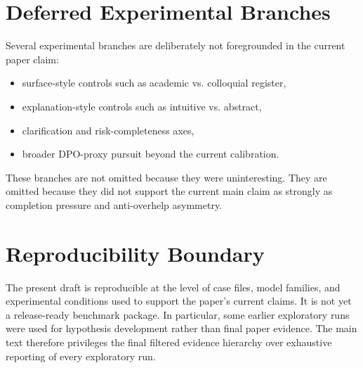 \documentclass[11pt]{article}
\begin{document}
\section{Deferred Experimental Branches}
Several experimental branches are deliberately not foregrounded in the current paper claim:
\begin{itemize}[leftmargin=1.5em]
  \item surface-style controls such as academic vs. colloquial register,
  \item explanation-style controls such as intuitive vs. abstract,
  \item clarification and risk-completeness axes,
  \item broader DPO-proxy pursuit beyond the current calibration.
\end{itemize}

These branches are not omitted because they were uninteresting. They are omitted because they did not support the current main claim as strongly as completion pressure and anti-overhelp asymmetry.

\section{Reproducibility Boundary}
The present draft is reproducible at the level of case files, model families, and experimental conditions used to support the paper's current claims. It is not yet a release-ready benchmark package. In particular, some earlier exploratory runs were used for hypothesis development rather than final paper evidence. The main text therefore privileges the final filtered evidence hierarchy over exhaustive reporting of every exploratory run.




\end{document}
